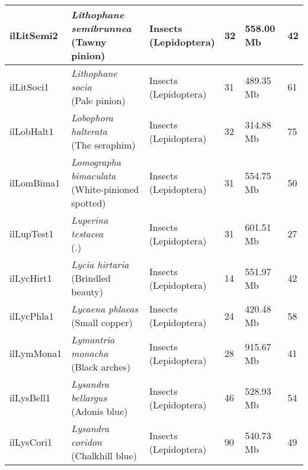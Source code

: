 \begin{centering}
\begin{longtable}{l|l|l|l|l|l}
ilLitSemi2 & \makecell[{l}]{\textit{Lithophane semibrunnea} \\ (Tawny pinion)} & \makecell[{l}]{Insects \\ (Lepidoptera)} & 32 & 558.00 Mb & 42  \\ \hline
ilLitSoci1 & \makecell[{l}]{\textit{Lithophane socia} \\ (Pale pinion)} & \makecell[{l}]{Insects \\ (Lepidoptera)} & 31 & 489.35 Mb & 61  \\ \hline
ilLobHalt1 & \makecell[{l}]{\textit{Lobophora halterata} \\ (The seraphim)} & \makecell[{l}]{Insects \\ (Lepidoptera)} & 32 & 314.88 Mb & 75  \\ \hline
ilLomBima1 & \makecell[{l}]{\textit{Lomographa bimaculata} \\ (White-pinioned spotted)} & \makecell[{l}]{Insects \\ (Lepidoptera)} & 31 & 554.75 Mb & 50  \\ \hline
ilLupTest1 & \makecell[{l}]{\textit{Luperina testacea} \\ (.)} & \makecell[{l}]{Insects \\ (Lepidoptera)} & 31 & 601.51 Mb & 27  \\ \hline
ilLycHirt1 & \makecell[{l}]{\textit{Lycia hirtaria} \\ (Brindled beauty)} & \makecell[{l}]{Insects \\ (Lepidoptera)} & 14 & 551.97 Mb & 42  \\ \hline
ilLycPhla1 & \makecell[{l}]{\textit{Lycaena phlaeas} \\ (Small copper)} & \makecell[{l}]{Insects \\ (Lepidoptera)} & 24 & 420.48 Mb & 58  \\ \hline
ilLymMona1 & \makecell[{l}]{\textit{Lymantria monacha} \\ (Black arches)} & \makecell[{l}]{Insects \\ (Lepidoptera)} & 28 & 915.67 Mb & 41  \\ \hline
ilLysBell1 & \makecell[{l}]{\textit{Lysandra bellargus} \\ (Adonis blue)} & \makecell[{l}]{Insects \\ (Lepidoptera)} & 46 & 528.93 Mb & 54  \\ \hline
ilLysCori1 & \makecell[{l}]{\textit{Lysandra coridon} \\ (Chalkhill blue)} & \makecell[{l}]{Insects \\ (Lepidoptera)} & 90 & 540.73 Mb & 49  \\ \hline

\end{longtable}
\end{centering}
